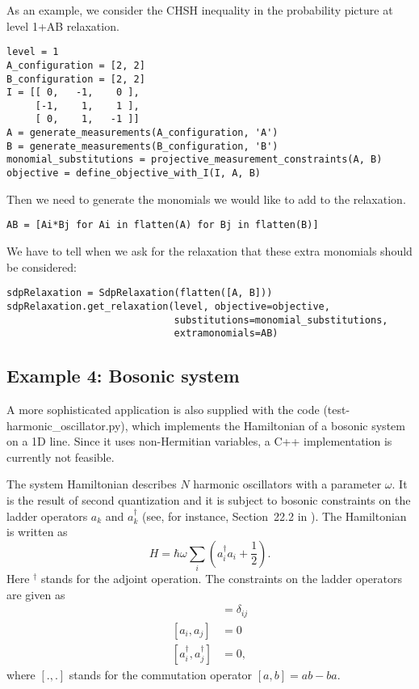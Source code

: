 \documentclass{article}
\begin{document}
As an example, we consider the CHSH inequality in the probability picture at level 1+AB relaxation.
\begin{verbatim}
level = 1
A_configuration = [2, 2]
B_configuration = [2, 2]
I = [[ 0,   -1,    0 ],
     [-1,    1,    1 ], 
     [ 0,    1,   -1 ]]
A = generate_measurements(A_configuration, 'A')
B = generate_measurements(B_configuration, 'B')
monomial_substitutions = projective_measurement_constraints(A, B)
objective = define_objective_with_I(I, A, B)
\end{verbatim}
Then we need to generate the monomials we would like to add to the relaxation.
\begin{verbatim}
AB = [Ai*Bj for Ai in flatten(A) for Bj in flatten(B)]  
\end{verbatim}
We have to tell when we ask for the relaxation that these extra monomials should be considered:
\begin{verbatim}
sdpRelaxation = SdpRelaxation(flatten([A, B]))
sdpRelaxation.get_relaxation(level, objective=objective,
                             substitutions=monomial_substitutions,
                             extramonomials=AB)
\end{verbatim}

\subsection{Example 4: Bosonic system}
A more sophisticated application is  also supplied with the code (test-harmonic\_oscillator.py), which implements the Hamiltonian of a bosonic system on a 1D line. Since it uses non-Hermitian variables, a C++ implementation is currently not feasible.

The system Hamiltonian describes $N$ harmonic oscillators with a parameter $\omega$. It is the result of second quantization and it is subject to bosonic constraints on the ladder operators $a_{k}$ and $a_{k}^{\dagger}$ (see, for instance, Section~22.2 in \cite{fayngold2013quantum}). The Hamiltonian is written as
\begin{equation}
  H = \hbar \omega\sum_{i}\left(a_{i}^{\dagger}a_{i}+\frac{1}{2}\right).
\end{equation}
Here $^{\dagger}$ stands for the adjoint operation. The constraints on the ladder operators are given as
\begin{align}
[a_{i},a_{j}^{\dagger}] &=  \delta_{ij} \\
[a_{i},a_{j}]  &=  0 \nonumber \\
[a_{i}^{\dagger},a_{j}^{\dagger}] &=  0,\nonumber
\end{align}
where $[.,.]$ stands for the commutation operator $[a,b]=ab-ba$. 
\end{document}
